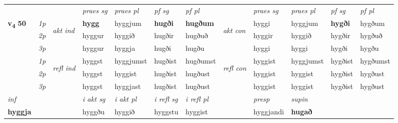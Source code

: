 \begin{longtable}[l]{X>{\footnotesize\itshape}llXXXXlXXXX}
 & &   & \textit{praes sg}  & \textit{praes pl}    & \textit{ pf sg} & \textit{pf pl} & & \textit{praes sg}  & \textit{praes pl}    & \textit{pf sg} & \textit{pf pl }  \\ \cmidrule{4-7} \cmidrule{9-12}
 \multirow{2}{*}{{{\textbf{v{\textsubscript{4}}} \Large{\textbf{50}}}}}  & 1p & \multirow{3}{*}{\begin{turn}{90}\textit{akt ind}\end{turn}} & \textbf{hygg} & hyggjum & \textbf{hugði} & \textbf{hugðum} & \multirow{3}{*}{\begin{turn}{90}\textit{akt con}\end{turn}} &hyggi & hyggjum & \textbf{hygði} & hygðum\\*
 & 2p &  &  hyggur  & hyggið & hugðir & hugðuð & & hyggir & hyggið & hygðir & hygðuð \\*
 & 3p &  & hyggur & hyggja & hugði & hugðu & & hyggi & hyggi& hygði & hygðu \\*
\cmidrule{4-7} \cmidrule{9-12}
 & 1p & \multirow{3}{*}{\begin{turn}{90}\textit{refl ind}\end{turn}}  & hyggst & hyggjumst & hugðist & hugðumst & \multirow{3}{*}{\begin{turn}{90}\textit{refl con}\end{turn}}  &hyggist & hyggjumst & hygðist & hygðumst \\*
 & 2p &  & hyggst & hyggist & hugðist & hugðust & &hyggist & hyggist & hygðist & hygðust \\*
 & 3p  & & hyggst & hyggjast & hugðist & hugðust & & hyggist & hyggist& hygðist & hygðust \\*
\cmidrule{4-7} \cmidrule{9-12}

   {\textit{inf}} & &  & \textit{i akt sg} & \textit{i akt pl} & \textit{i refl sg} & \textit{i refl pl} && \textit{presp} & \textit{supin}   \\*
  {\textbf{hyggja}} & && hyggðu  & hyggið & hyggstu & hyggist && hyggjandi &  \textbf{hugað}   \\*

\midrule


\end{longtable}
